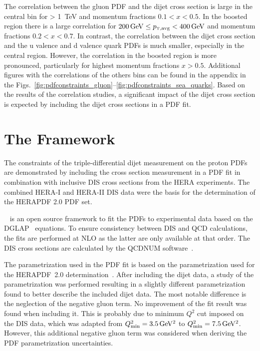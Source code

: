 The correlation between the gluon PDF and the dijet cross section is large in
the central bin for \ptavg > \SI{1}{\TeV} and momentum fractions $0.1 < x <
0.5$. In the boosted region there is a large correlation for $\SI{200}{\GeV}
\leq \ptavg < \SI{400}{\GeV}$ and momentum fractions $0.2 < x < 0.7$. In
contrast, the correlation between the dijet cross section and the u valence and
d valence quark PDFs is much smaller, especially in the central region. However,
the correlation in the boosted region is more pronounced, particularly for
highest momentum fractions $x > 0.5$. Additional figures with the correlations
of the others bins can be found in the appendix in the
Figs.~\ref{fig:pdfconstraints_gluon}--\ref{fig:pdfconstraints_sea_quarks}. Based
on the results of the correlation studies, a significant impact of the dijet
cross section is expected by including the dijet cross sections in a PDF fit.

\section{The \xfitter Framework}
\label{section:herafittersetup}

The constraints of the triple-differential dijet measurement on the proton PDFs
are demonstrated by including the cross section measurement in a PDF fit in
combination with inclusive DIS cross sections from the HERA experiments. The
combined HERA-I and HERA-II DIS data were the
basis for the determination of the HERAPDF 2.0 PDF set.

\xfitter~\cite{Alekhin:2014irh} is an open source framework to fit the PDFs to experimental data based
on the DGLAP~\cite{Gribov:1972ri,Altarelli:1977zs,Dokshitzer:1977sg} equations.
To ensure consistency between DIS and QCD calculations, the fits are performed
at NLO as the latter are only available at that order. The DIS cross sections
are calculated by the QCDNUM software~\cite{Botje:2010ay}.

The parametrization used in the PDF fit is based on the parametrization used for
the HERAPDF~2.0 determination~\cite{Abramowicz:2015mha}. After including the
dijet data, a study of the parametrization was performed resulting in a slightly
different parametrization found to better describe the included dijet data. The
most notable difference is the neglection of the negative gluon term. No
improvement of the fit result was found when including it. This is probably due
to minimum $Q^2$ cut imposed on the DIS data, which was adapted from
$Q^2_\mathrm{min}=\SI{3.5}{\GeVsq}$ to $Q^2_\mathrm{min}=\SI{7.5}{\GeVsq}$.
However, this additional negative gluon term was considered when deriving the
PDF parametrization uncertainties.

